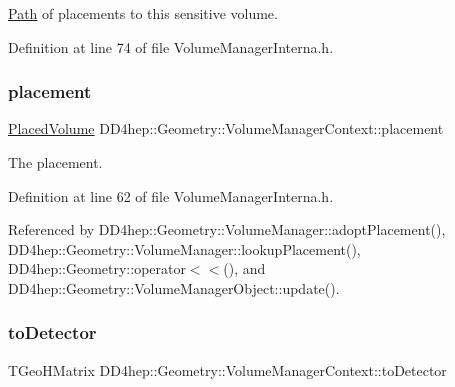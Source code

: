 \hyperlink{class_d_d4hep_1_1_path}{Path} of placements to this sensitive volume. 



Definition at line 74 of file Volume\+Manager\+Interna.\+h.

\hypertarget{class_d_d4hep_1_1_geometry_1_1_volume_manager_context_aa6c87ac47a16aa5094ca87d5991ab91f}{}\label{class_d_d4hep_1_1_geometry_1_1_volume_manager_context_aa6c87ac47a16aa5094ca87d5991ab91f} 
\subsubsection{\texorpdfstring{placement}{placement}}
{\footnotesize\ttfamily \hyperlink{class_d_d4hep_1_1_geometry_1_1_placed_volume}{Placed\+Volume} D\+D4hep\+::\+Geometry\+::\+Volume\+Manager\+Context\+::placement}



The placement. 



Definition at line 62 of file Volume\+Manager\+Interna.\+h.



Referenced by D\+D4hep\+::\+Geometry\+::\+Volume\+Manager\+::adopt\+Placement(), D\+D4hep\+::\+Geometry\+::\+Volume\+Manager\+::lookup\+Placement(), D\+D4hep\+::\+Geometry\+::operator$<$$<$(), and D\+D4hep\+::\+Geometry\+::\+Volume\+Manager\+Object\+::update().

\hypertarget{class_d_d4hep_1_1_geometry_1_1_volume_manager_context_a0978a0bffd0e0669f14d0ddea43ea6bb}{}\label{class_d_d4hep_1_1_geometry_1_1_volume_manager_context_a0978a0bffd0e0669f14d0ddea43ea6bb} 
\subsubsection{\texorpdfstring{to\+Detector}{toDetector}}
{\footnotesize\ttfamily T\+Geo\+H\+Matrix D\+D4hep\+::\+Geometry\+::\+Volume\+Manager\+Context\+::to\+Detector}



